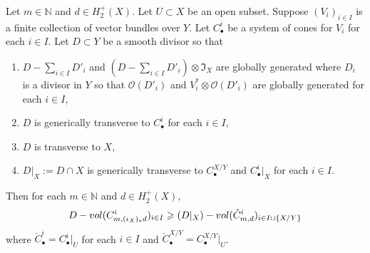 \documentclass[10pt,a4paper]{amsart}
\newcommand{\BL}{\mathrm{Bl}}
\newcommand{\Vol}{\textnormal{-vol}}
\newcommand{\bN}{\mathbb{N}}
\newcommand{\calO}{\mathcal{O}}
\newcommand{\frI}{\mathfrak{I}}
\renewcommand{\geq}{\geqslant}
\begin{document}
\begin{prop} \label{propositionboundsfornormalcones}
	Let $m \in \bN$ and $d \in H_2^+(X)$.
	Let $U \subset X$ be an open subset.
	Suppose $(V_i)_{i \in I}$ is a finite collection of vector bundles over $Y$. Let $C^i_\bullet$ be a system of cones for $V_i$ for each $i \in I$.
	Let $D \subset Y$ be a smooth divisor so that
	\begin{enumerate}
		\item $D-\sum_{i \in I} D'_i$
		      and $(D-\sum_{i \in I} D'_i) \otimes \frI_X$
		      are globally generated
		      where $D_i$ is a divisor in $Y$ so that $\calO(D'_i)$ and $V_i^* \otimes \calO(D'_i)$ are globally generated
		      for each $i \in I$,
		\item $D$ is generically transverse to $C^i_\bullet$ for each $i \in I$,
		\item $D$ is transverse to $X$,
		\item $D|_X := D \cap X$ is generically transverse to $C^{X/Y}_\bullet$ and $C^i_\bullet|_X$ for each $i \in I$.
	\end{enumerate}
	Then for each $m \in \bN$ and $d \in H_2^+(X)$,
	\begin{equation} \label{eqnkeyvoleumnormalinequality}
		D\Vol(C^i_{m,(\iota_X)_*d})_{i \in I} \geq (D|_X)\Vol(\check{C}^i_{m,d})_{i \in  I \sqcup \{X/Y\}}
	\end{equation}
	where
	$\check{C}^i_\bullet = C^i_\bullet|_U$ for each $i \in I$ and $\check{C}^{X/Y}_\bullet = C^{X/Y}_\bullet|_U$.
\end{prop}
\end{document}

